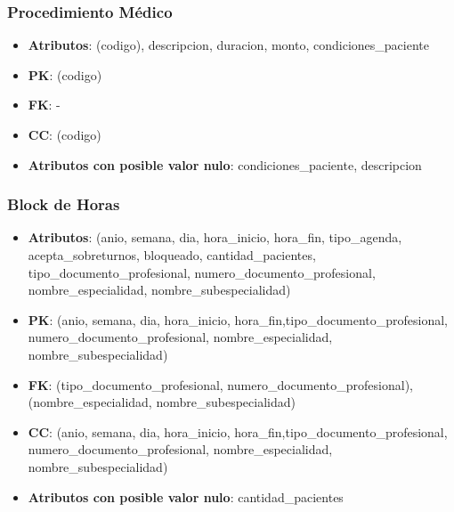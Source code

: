 \documentclass[a4paper,11pt]{article}
\begin{document}
\subsubsection{\textbf{Procedimiento Médico}}

\begin{itemize}

\item 
\textbf{Atributos}: (codigo), descripcion, duracion, monto, condiciones\_paciente

\item 
\textbf{PK}: (codigo)

\item
\textbf{FK}: - 

\item 
\textbf{CC}: (codigo)

\item 
\textbf{Atributos con posible valor nulo}: condiciones\_paciente, descripcion

\end{itemize}


\subsubsection{\textbf{Block de Horas}}

\begin{itemize}

\item 
\textbf{Atributos}:  (anio, semana, dia, hora\_inicio, hora\_fin, tipo\_agenda, acepta\_sobreturnos,  bloqueado, cantidad\_pacientes, tipo\_documento\_profesional, numero\_documento\_profesional, nombre\_especialidad, nombre\_subespecialidad)

\item 
\textbf{PK}: (anio, semana, dia, hora\_inicio, hora\_fin,tipo\_documento\_profesional, numero\_documento\_profesional, nombre\_especialidad, nombre\_subespecialidad)

\item
\textbf{FK}:  (tipo\_documento\_profesional, numero\_documento\_profesional), (nombre\_especialidad, nombre\_subespecialidad)

\item 
\textbf{CC}: (anio, semana, dia, hora\_inicio, hora\_fin,tipo\_documento\_profesional,\\
 numero\_documento\_profesional, nombre\_especialidad, nombre\_subespecialidad)

\item 
\textbf{Atributos con posible valor nulo}: cantidad\_pacientes

\end{itemize}
\end{document}

